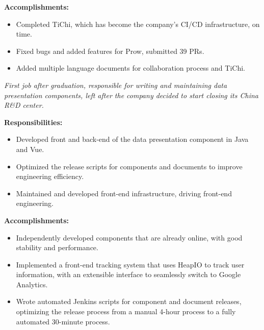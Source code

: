 \documentclass{software_engineer_rustin_liu}
\newcommand{\en}[1]{#1}
\newcommand{\zh}[1]{}
\begin{document}
\en{\textbf{Accomplishments:}}
\zh{\textbf{产出：}}
\begin{itemize}
      \item \en{Completed TiChi, which has become the company’s CI/CD infrastructure, on time.}
            \zh{按时完成了项目的设计和开发，TiChi 已经成为了公司 CI/CD 的基础设施。}
      \item \en{Fixed bugs and added features for Prow, submitted 39 PRs.}
            \zh{为 Prow 修复 bug 和添加功能，提交了 39 个 PR。}
      \item \en{Added multiple language documents for collaboration process and TiChi.}
            \zh{为 TiChi 编写了良好的文档，明确了协作流程，为开源贡献者提供了更好的协作体验。}
\end{itemize}

\en{}
\zh{\datedsubsection{\textbf{\href{https://www.morningstar.com/}{晨星资讯（Morningstar, Inc.）- 金融服务 - 前后端开发工程师}}}{2019/06 -- 2020/07}}
\en{\textsl{First job after graduation, responsible for writing and maintaining data presentation components, left after the company decided to start closing its China R\&D center.}}
\zh{\textsl{毕业后第一份工作，负责编写和维护数据展示组件，在公司决定开始关闭中国研发中心后离职。}}

\en{\textbf{Responsibilities:}}
\zh{\textbf{职责：}}
\begin{itemize}
      \item \en{Developed front and back-end of the data presentation component in Java and Vue.}
            \zh{负责数据展示组件的前后端开发，使用 Java 和 Vue 开发。}
      \item \en{Optimized the release scripts for components and documents to improve engineering efficiency.}
            \zh{负责组件和文档发布脚本的优化，提升工程效率。}
      \item \en{Maintained and developed front-end infrastructure, driving front-end engineering.}
            \zh{负责前端基础设施维护和开发，尝试和推动前端工程化。}
\end{itemize}

\en{\textbf{Accomplishments:}}
\zh{\textbf{产出：}}
\begin{itemize}
      \item \en{Independently developed components that are already online, with good stability and performance.}
            \zh{多个独立开发的组件已经上线使用，有较好的稳定性和性能。}
      \item \en{Implemented a front-end tracking system that uses HeapIO to track user information, with an extensible interface to seamlessly switch to Google Analytics.}
            \zh{实现了前端的 tracking 系统，使用 HeapIO 追踪用户信息，并预留可扩展接口，可无缝切换至 Google Analytics。}
      \item \en{Wrote automated Jenkins scripts for component and document releases, optimizing the release process from a manual 4-hour process to a fully automated 30-minute process.}
            \zh{为组件和文档发布编写了自动化 Jenkins 脚本，将发布流程从手动 4 小时优化到全自动 30 分钟。}
\end{itemize}
\end{document}
